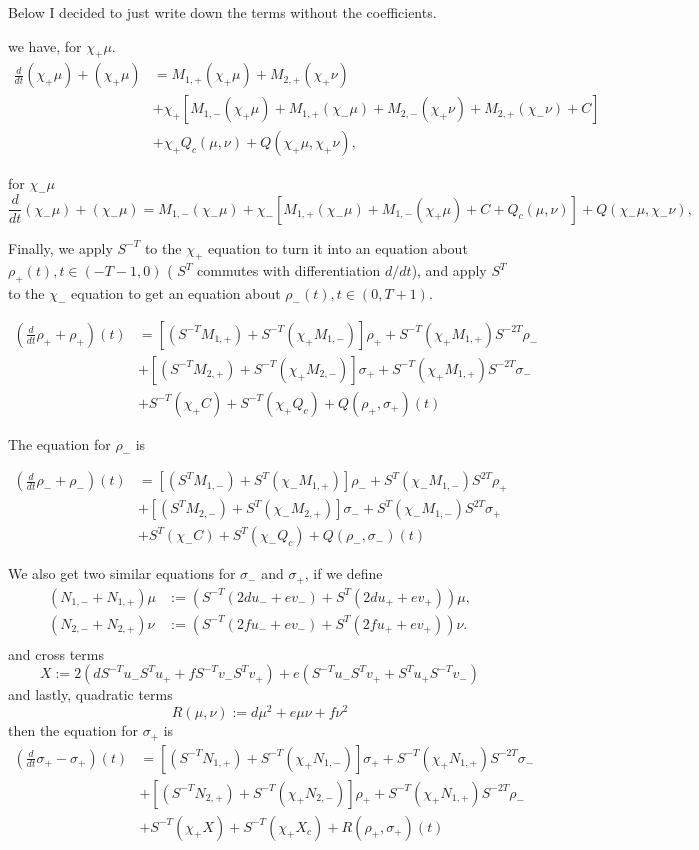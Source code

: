 \documentclass[letterpaper,11pt]{article}
\numberwithin{equation}{section}
\theoremstyle{plain}
\begin{document}
Below I decided to just write down the terms without the 
coefficients.


we have, for $\chi_+\mu$. 
\begin{align*}
\frac{d}{dt} (\chi_+\mu) + (\chi_+\mu ) &= M_{1,+}(\chi_+\mu)+M_{2,+}(\chi_+\nu)\\
&+\chi_+[M_{1,-}(\chi_+\mu)+M_{1,+}(\chi_-\mu)
+M_{2,-}(\chi_+\nu)+M_{2,+}(\chi_-\nu)+C] \\
&+ \chi_+Q_c(\mu,\nu)+Q(\chi_+\mu,\chi_+\nu),
\end{align*}


for $\chi_-\mu$
\[
\frac{d}{dt} (\chi_-\mu) + (\chi_-\mu ) = M_{1,-}(\chi_-\mu)+\chi_-[M_{1,+}(\chi_-\mu)+M_{1,-}(\chi_+\mu)
+C+ Q_c(\mu,\nu)]+Q(\chi_-\mu,\chi_-\nu),
\]

Finally, we apply $S^{-T}$ to the $\chi_+$ equation to turn it into an equation about $\rho_+(t), t\in (-T-1,0)$ ( $S^T$ commutes with differentiation $d/dt$), and apply $S^T$ to the $\chi_-$ equation to get an equation about $\rho_-(t), t \in (0,T+1)$.

\begin{align*}
\left(\frac{d}{dt} \rho_+ + \rho_+\right)(t) &= [(S^{-T}M_{1,+})+S^{-T}(\chi_+M_{1,-})]\rho_+ + S^{-T}(\chi_+M_{1,+})S^{-2T}\rho_-\\
&+[(S^{-T}M_{2,+})+S^{-T}(\chi_+M_{2,-})]\sigma_+ + S^{-T}(\chi_+M_{1,+})S^{-2T}\sigma_-\\
& + S^{-T}(\chi_+C)+S^{-T}(\chi_+Q_c) + Q(\rho_+,\sigma_+)(t)
\end{align*}

The equation for $\rho_-$ is

\begin{align*}
\left(\frac{d}{dt} \rho_- + \rho_-\right)(t) &= [(S^{T}M_{1,-})+S^{T}(\chi_-M_{1,+})]\rho_- + S^{T}(\chi_-M_{1,-})S^{2T}\rho_+\\
&+[(S^{T}M_{2,-})+S^{T}(\chi_-M_{2,+})]\sigma_- + S^{T}(\chi_-M_{1,-})S^{2T}\sigma_+\\
& + S^{T}(\chi_-C)+S^{T}(\chi_-Q_c) + Q(\rho_-,\sigma_-)(t)
\end{align*}

We also get two similar equations for $\sigma_-$ and $\sigma_+$, if we define 
\begin{align*}
(N_{1,-}+N_{1,+})\mu &:= (S^{-T}(2du_-+ev_-)+S^T(2du_++ev_+))\mu, \\ 
(N_{2,-}+N_{2,+})\nu &:=(S^{-T}(2fu_-+ev_-)+S^T(2fu_++ev_+))\nu. \\
\end{align*}
and cross terms
\[
X:=2(dS^{-T}u_-S^Tu_++fS^{-T}v_-S^Tv_+)+e(S^{-T}u_-S^Tv_++S^Tu_+S^{-T}v_-)
\]
and lastly, quadratic terms
\[
R(\mu,\nu):=d\mu^2+e\mu \nu+f\nu^2
\]
then the equation for $\sigma_+$ is
\begin{align*}
\left(\frac{d}{dt} \sigma_+ - \sigma_+\right)(t) &= [(S^{-T}N_{1,+})+S^{-T}(\chi_+N_{1,-})]\sigma_+ + S^{-T}(\chi_+N_{1,+})S^{-2T}\sigma_-\\
&+[(S^{-T}N_{2,+})+S^{-T}(\chi_+N_{2,-})]\rho_+ + S^{-T}(\chi_+N_{1,+})S^{-2T}\rho_-\\
& + S^{-T}(\chi_+X)+S^{-T}(\chi_+X_c) + R(\rho_+,\sigma_+)(t)
\end{align*}
\end{document}
